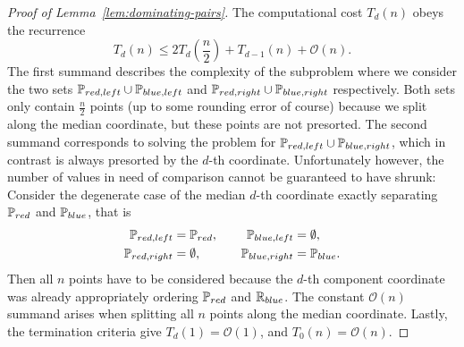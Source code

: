 \begin{proof}[Proof of Lemma~\ref{lem:dominating-pairs}]
    The computational cost $T_d(n)$ obeys the recurrence
    \begin{equation}\label{eq:recurrence}
        T_d(n) \leq 2 T_d\left( \frac{n}{2} \right) + T_{d - 1}(n) + \mathcal{O}(n).
    \end{equation}
    The first summand describes the complexity of the subproblem where we consider the two sets $\mathbb{P}_{red, left} \cup \mathbb{P}_{blue, left}$ and $\mathbb{P}_{red, right} \cup \mathbb{P}_{blue, right}$ respectively.
    Both sets only contain $\frac{n}{2}$ points (up to some rounding error of course) because we split along the median coordinate, but these points are not presorted.
    The second summand corresponds to solving the problem for $\mathbb{P}_{red, left} \cup \mathbb{P}_{blue, right}$, which in contrast is always presorted by the $d$-th coordinate.
    Unfortunately however, the number of values in need of comparison cannot be guaranteed to have shrunk:
    Consider the degenerate case of the median $d$-th coordinate exactly separating $\mathbb{P}_{red}$ and $\mathbb{P}_{blue}$, that is
    \[
        \begin{split}
            \mathbb{P}_{red, left} &= \mathbb{P}_{red}, \\
            \mathbb{P}_{red, right} &= \emptyset,
        \end{split}
        \qquad
        \begin{split}
            \mathbb{P}_{blue, left} &= \emptyset, \\
            \mathbb{P}_{blue, right} &= \mathbb{P}_{blue}.
        \end{split}
    \]
    Then all $n$ points have to be considered because the $d$-th component coordinate was already appropriately ordering $\mathbb{P}_{red}$ and $\mathbb{R}_{blue}$.
    The constant $\mathcal{O}(n)$ summand arises when splitting all $n$ points along the median coordinate.
    Lastly, the termination criteria give $T_d(1) = \mathcal{O}(1)$, and $T_0(n) = \mathcal{O}(n)$.


\end{proof}
